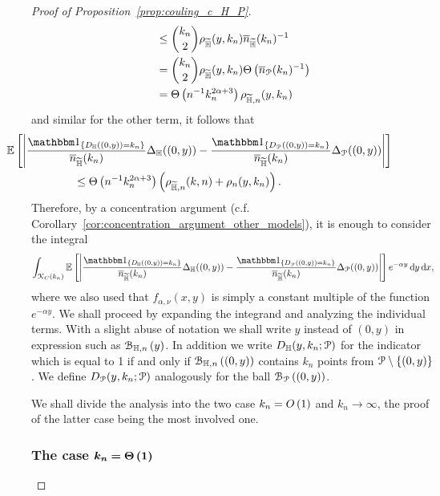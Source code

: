\begin{proof}[Proof of Proposition~\ref{prop:couling_c_H_P}]
\begin{align*}
	&\le \binom{k_n}{2} \rho_{\widetilde{\mathbb{H}}}(y,k_n)\overline{n}_{\widetilde{\mathbb{H}}}(k_n)^{-1} \\
	&= \binom{k_n}{2} \rho_{\widetilde{\mathbb{H}}}(y,k_n)\Theta\left(\overline{n}_{{\mathcal P}}(k_n)^{-1}\right)\\
	&= \Theta\left(n^{-1} k_n^{2\alpha + 3}\right)\rho_{\widetilde{\mathbb{H}},n}(y,k_n)
\end{align*}
and similar for the other term, it follows that
\begin{align*}
	&\hspace{-60pt}\Exp{ \left| \frac{\ind{D_\H((0,y)) = k_n}}{\expH} \Delta_\H ((0,y) )
		- \frac{\ind{D_\Pcal((0,y)) = k_n}}{\expH}  \Delta_\Pcal ((0,y))\right|} \\
	&\le \bigT{n^{-1} k_n^{2\alpha + 3}}\left(\rho_{\HP,n}(k,n) + \rho_n(y,k_n)\right).
\end{align*}
Therefore, by a concentration argument (c.f. Corollary~\ref{cor:concentration_argument_other_models}), it is enough to consider the integral
\begin{equation} \label{eq:expectation_total}
	\int_{\Kcal_{C}(k_n)} \Exp{\left|\frac{\ind{D_\H((0,y)) = k_n}}{\expH} \Delta_\H ((0,y) ) 
		- \frac{\ind{D_\Pcal((0,y)) = k_n}}{\expH} \Delta_\Pcal ((0,y))\right|} e^{-\alpha y} \dd y \dd x,
\end{equation}
where we also used that $f_{\alpha,\nu}(x,y)$ is simply a constant multiple of the function $e^{-\alpha y}$. We shall proceed by expanding the integrand and analyzing the individual terms. With a slight abuse of notation we shall write $y$ instead of $(0,y)$ in expression such as ${\mathcal B}_{\mathbb{H},n}\left(y\right)$. In addition we write $D_{\mathbb{H}}(y,k_n;{\mathcal P})$ for the indicator which is equal to 1 if and only if ${\mathcal B}_{\mathbb{H},n}\left((0,y)\right)$ contains $k_n$ points from ${\mathcal P} \setminus \{(0,y)\}$. We define $D_{{\mathcal P}}(y,k_n;{\mathcal P})$ analogously for the ball ${\mathcal B}_{{\mathcal P}}\left((0,y)\right)$.

We shall divide the analysis into the two case $k_n = O\left(1\right)$ and $k_n \to \infty$, the proof of the latter case being the most involved one. 

\subsubsection*{The case $\bm{k_n = \Theta\left(1\right)}$}


\end{proof}
